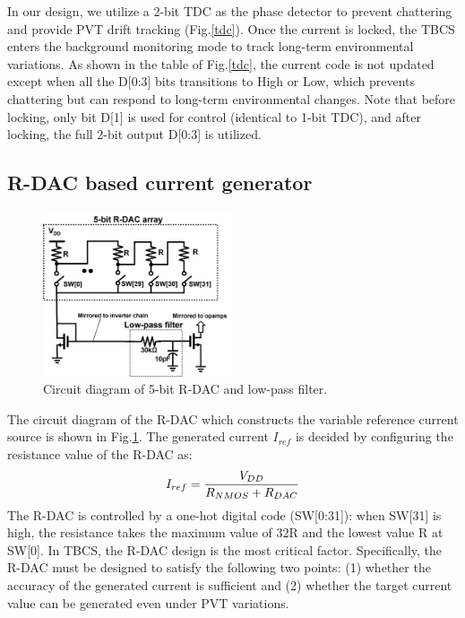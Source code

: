 \documentclass[letterpaper, 10 pt, conference]{ieeeconf}  %
\begin{document}
In our design, we utilize a 2-bit TDC as the phase detector to prevent chattering and  provide PVT drift tracking (Fig.\ref{tdc}).
Once the current is locked, the TBCS enters the background monitoring mode to track long-term environmental variations.  As shown in the table of Fig.\ref{tdc}, the current code is not updated except when all the D[0:3] bits transitions to High or Low, which prevents chattering but can respond to long-term environmental changes. Note that before locking, only bit D[1] is used for control (identical to 1-bit TDC), and after locking, the full 2-bit output D[0:3] is utilized.

\subsection{R-DAC based current generator}
\begin{figure}[!]
\centering
 \includegraphics[width=0.5\textwidth]{figs/rdac.png}
  \caption{Circuit diagram of 5-bit R-DAC and low-pass filter.}
\label{rdac_sche}
\end{figure}

The circuit diagram of the R-DAC which constructs the variable reference current source is shown in Fig.\ref{rdac_sche}. The generated current $I_{ref}$ is decided by configuring the resistance value of the R-DAC as:
\begin{eqnarray}
    \centering
     I_{ref} = \frac{V_{DD}}{R_{NMOS}+R_{DAC}}
    \label{iref_eq}
\end{eqnarray}
The R-DAC is controlled by a one-hot digital code (SW[0:31]): when SW[31] is high, the resistance takes the maximum value of 32R and the lowest value R at SW[0]. In TBCS, the R-DAC design is the most critical factor. Specifically, the R-DAC must be designed to satisfy the following two points: (1) whether the accuracy of the generated current is sufficient and (2) whether the target current value can be generated even under PVT variations.
\end{document}
